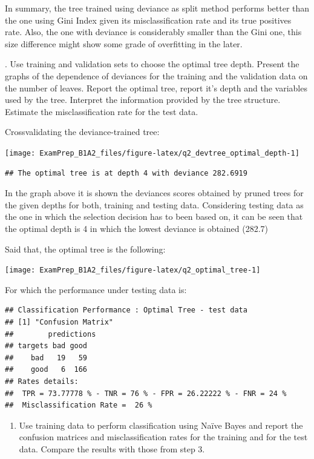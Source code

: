 \documentclass[
]{article}
\providecommand{\tightlist}{%
  \setlength{\itemsep}{0pt}\setlength{\parskip}{0pt}}
\begin{document}
In summary, the tree trained using deviance as split method performs
better than the one using Gini Index given its misclassification rate
and its true positives rate. Also, the one with deviance is considerably
smaller than the Gini one, this size difference might show some grade of
overfitting in the later.


. Use training and validation sets to choose the optimal tree depth.
Present the graphs of the dependence of deviances for the training and
the validation data on the number of leaves. Report the optimal tree,
report it's depth and the variables used by the tree. Interpret the
information provided by the tree structure. Estimate the
misclassification rate for the test data.

Crossvalidating the deviance-trained tree:

\begin{center}\texttt{[image: ExamPrep\_B1A2\_files/figure-latex/q2\_devtree\_optimal\_depth-1]} \end{center}

\begin{verbatim}
## The optimal tree is at depth 4 with deviance 282.6919
\end{verbatim}

In the graph above it is shown the deviances scores obtained by pruned
trees for the given depths for both, training and testing data.
Considering testing data as the one in which the selection decision has
to been based on, it can be seen that the optimal depth is 4 in which
the lowest deviance is obtained (282.7)

Said that, the optimal tree is the following:

\begin{center}\texttt{[image: ExamPrep\_B1A2\_files/figure-latex/q2\_optimal\_tree-1]} \end{center}

For which the performance under testing data is:

\begin{verbatim}
## Classification Performance : Optimal Tree - test data 
## [1] "Confusion Matrix"
##        predictions
## targets bad good
##    bad   19   59
##    good   6  166
## Rates details:
##  TPR = 73.77778 % - TNR = 76 % - FPR = 26.22222 % - FNR = 24 %
##  Misclassification Rate =  26 %
\end{verbatim}

\begin{enumerate}
\def\labelenumi{\arabic{enumi}.}
\setcounter{enumi}{3}
\tightlist
\item
  Use training data to perform classification using Naïve Bayes and
  report the confusion matrices and misclassification rates for the
  training and for the test data. Compare the results with those from
  step 3.
\end{enumerate}
\end{document}
